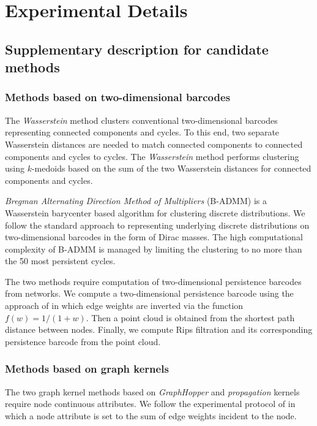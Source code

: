 \documentclass{article} %
\begin{document}
\section{Experimental Details}
\label{supp:experiment}

\subsection{Supplementary description for candidate methods}


\subsubsection*{Methods based on two-dimensional barcodes}
The {\em Wasserstein} method clusters conventional two-dimensional barcodes representing connected components and cycles. To this end, two separate Wasserstein distances are needed to match connected components to connected components and cycles to cycles. The {\em Wasserstein} method performs clustering using $k$-medoids based on the sum of the two Wasserstein distances for connected components and cycles.

{\em Bregman Alternating Direction Method of Multipliers} (B-ADMM) \citep{ye2017fast} is a Wasserstein barycenter based algorithm for clustering discrete distributions. We follow the standard approach \citep{turner2014frechet} to representing underlying discrete distributions on two-dimensional barcodes in the form of Dirac masses. The high computational complexity of B-ADMM is managed by limiting the clustering to no more than the 50 most persistent cycles.

The two methods require computation of two-dimensional persistence barcodes from networks. We compute a two-dimensional persistence barcode using the approach of \citet{otter2017roadmap} in which edge weights are inverted via the function $f(w)=1/(1+w)$. Then a point cloud is obtained from the shortest path distance between nodes. Finally, we compute Rips filtration \citep{ghrist2008barcodes} and its corresponding persistence barcode from the point cloud.


\subsubsection*{Methods based on graph kernels}
The two graph kernel methods based on {\em GraphHopper} and {\em propagation} kernels require node continuous attributes. We follow the experimental protocol of \citet{borgwardt2020graph} in which a node attribute is set to the sum of edge weights incident to the node.
\end{document}

